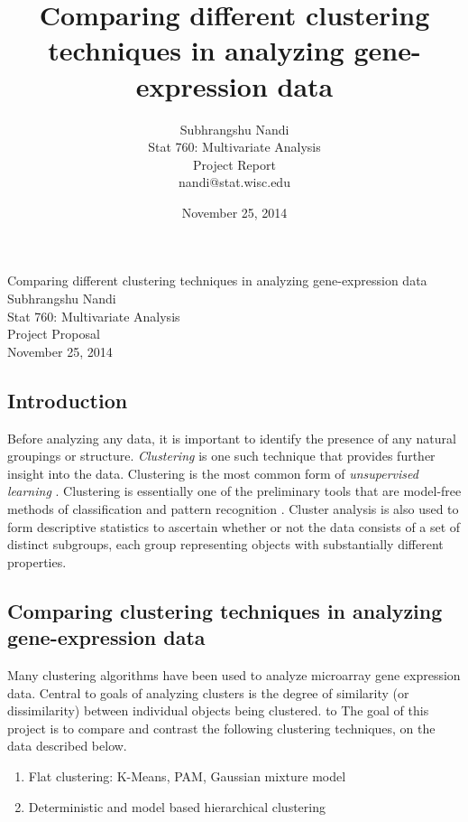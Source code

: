 \documentclass[11pt]{extarticle} %
\begin{document}

\title{Comparing different clustering techniques in analyzing gene-expression data}
\author{Subhrangshu Nandi\\
  Stat 760: Multivariate Analysis\\
  Project Report \\
  nandi@stat.wisc.edu}
\date{November 25, 2014}


\begin{center}
{\Large{Comparing different clustering techniques in analyzing gene-expression data}}\\
Subhrangshu Nandi\\
Stat 760: Multivariate Analysis\\
Project Proposal\\
November 25, 2014
\end{center}

\subsection*{Introduction}
Before analyzing any data, it is important to identify the presence of any natural groupings or structure. {\emph{Clustering}} is one such technique that provides further insight into the data. Clustering is the most common form of {\emph{unsupervised learning}} \citep{Manning_etal_2008_Information}. Clustering is essentially one of the preliminary tools that are model-free methods of classification and pattern recognition \citep{Hastie_etal_2009_Elements}. Cluster analysis is also used to form descriptive statistics to ascertain whether or not the data consists of a set of distinct subgroups, each group representing objects with substantially different properties.

\subsection*{Comparing clustering techniques in analyzing gene-expression data}
Many clustering algorithms have been used to analyze microarray gene expression data. Central to goals of analyzing clusters is the degree of similarity (or dissimilarity) between individual objects being clustered. to The goal of this project is to compare and contrast the following clustering techniques, on the data described below.
\begin{enumerate}
\item Flat clustering: K-Means, PAM, Gaussian mixture model
\item Deterministic and model based hierarchical clustering
\end{enumerate}
\end{document}
